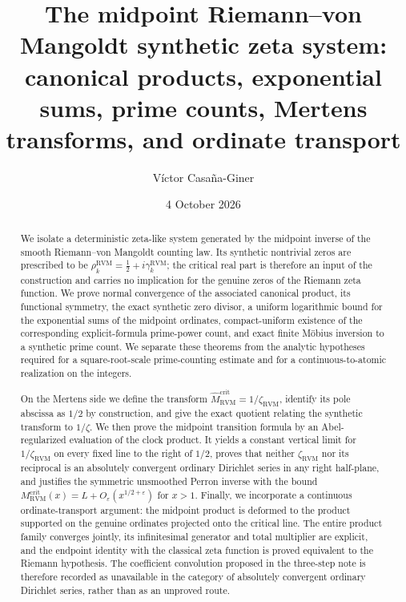 \documentclass[11pt,reqno]{amsart}
\title[The midpoint RVM synthetic zeta system]{The midpoint Riemann--von Mangoldt synthetic zeta system:\\
canonical products, exponential sums, prime counts, Mertens transforms, and ordinate transport}
\author{V\'ictor Casa\~na-Giner}
\date{4 October 2026}
\theoremstyle{definition}
\theoremstyle{remark}
\newcommand{\RVM}{\mathrm{RVM}}
\newcommand{\crit}{\mathrm{crit}}
\begin{document}
\begin{abstract}
We isolate a deterministic zeta-like system generated by the midpoint inverse of the smooth Riemann--von Mangoldt counting law.  Its synthetic nontrivial zeros are prescribed to be
$\rho_k^{\RVM}=\tfrac12+i\gamma_k^{\RVM}$; the critical real part is therefore an input of the construction and carries no implication for the genuine zeros of the Riemann zeta function.  We prove normal convergence of the associated canonical product, its functional symmetry, the exact synthetic zero divisor, a uniform logarithmic bound for the exponential sums of the midpoint ordinates, compact-uniform existence of the corresponding explicit-formula prime-power count, and exact finite M\"obius inversion to a synthetic prime count.  We separate these theorems from the analytic hypotheses required for a square-root-scale prime-counting estimate and for a continuous-to-atomic realization on the integers.

On the Mertens side we define the transform $\widehat M_{\RVM}^{\crit}=1/\zeta_{\RVM}$, identify its pole abscissa as $1/2$ by construction, and give the exact quotient relating the synthetic transform to $1/\zeta$.  We then prove the midpoint transition formula by an Abel-regularized evaluation of the clock product.  It yields a constant vertical limit for $1/\zeta_{\RVM}$ on every fixed line to the right of $1/2$, proves that neither $\zeta_{\RVM}$ nor its reciprocal is an absolutely convergent ordinary Dirichlet series in any right half-plane, and justifies the symmetric unsmoothed Perron inverse with the bound $M_{\RVM}^{\crit}(x)=L+O_\varepsilon(x^{1/2+\varepsilon})$ for $x>1$.  Finally, we incorporate a continuous ordinate-transport argument: the midpoint product is deformed to the product supported on the genuine ordinates projected onto the critical line.  The entire product family converges jointly, its infinitesimal generator and total multiplier are explicit, and the endpoint identity with the classical zeta function is proved equivalent to the Riemann hypothesis.  The coefficient convolution proposed in the three-step note is therefore recorded as unavailable in the category of absolutely convergent ordinary Dirichlet series, rather than as an unproved route.
\end{abstract}
\maketitle

\tableofcontents
\end{document}
